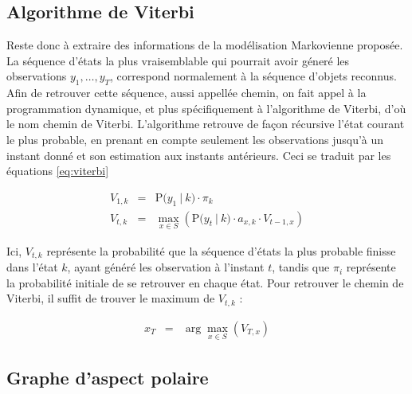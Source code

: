 \subsection{Algorithme de Viterbi}

Reste donc à extraire des informations de la modélisation Markovienne proposée.
La séquence d'états la plus vraisemblable qui pourrait avoir géneré
les observations  $y_1,\dots, y_T$, correspond normalement à la séquence d'objets reconnus.
Afin de retrouver cette séquence, aussi appellée chemin, on fait 
appel à la programmation dynamique, et plus spécifiquement à l'algorithme de Viterbi, d'où le nom chemin de Viterbi.
L'algorithme retrouve de façon récursive l'état courant le plus probable, en
prenant en compte seulement les observations jusqu'à un instant donné et son
estimation aux instants antérieurs. Ceci se traduit par les équations \ref{eq:viterbi}

\begin{equation}
  \begin{array}{rcl}
    V_{1,k} &=& \mathrm{P}\big( y_1 \ | \ k \big) \cdot \pi_k \\
    V_{t,k} &=& \max_{x \in S} \left(  \mathrm{P}\big( y_t \ | \ k \big) \cdot a_{x,k} \cdot V_{t-1,x}\right)
  \end{array}
	\label{eq:viterbi}
\end{equation}

Ici, $V_{t,k}$ représente la probabilité que la séquence d'états la plus probable finisse dans l'état $k$, ayant généré les observation à l'instant $t$, tandis que $\pi_i$ représente la probabilité initiale de se retrouver en chaque état. Pour retrouver le chemin de Viterbi, il suffit de trouver le maximum de $V_{t,k}$ :

\begin{equation}
  \begin{array}{rcl}
    x_T &=& \arg\max_{x \in S} (V_{T,x})
  \end{array}
\end{equation}

\subsection {Graphe d'aspect polaire}

